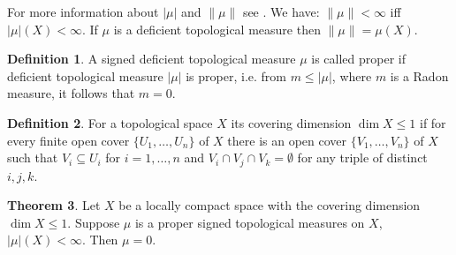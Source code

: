 \documentclass[sn-mathphys-num]{sn-jnl}%
\theoremstyle{thmstyleone}%
\theoremstyle{definition}
\newtheorem{theorem}{Theorem}%
\newtheorem{definition}[theorem]{Definition}
\begin{document}
\noindent
For more information about $ | \mu |$ and $ \| \mu \|$ see \cite[Sect. 2]{Butler:STMLC}. We have: $\| \mu \| < \infty$ iff $ | \mu| (X)  < \infty$.
If $\mu$ is a deficient topological measure then $ \| \mu \| = \mu(X)$. 
  
\begin{definition} \label{properSDTM}
A signed deficient topological measure $\mu$  is called proper if  deficient topological measure  $ | \mu |$ is proper, i.e.
from $m \le |\mu| $, where $m$ is a Radon measure, it follows that $m = 0$.
\end{definition}

\begin{definition} \label{dimX}
For a topological space $X$ its covering dimension $\dim X \le 1$ if for every finite open cover $\{ U_1, \ldots, U_n\}$ of $X$ there is an open cover
$\{ V_1, \ldots, V_n\}$ of $X$ such that $ V_i \subseteq U_i$ for $ i=1, \ldots, n$ and $V_i \cap V_j \cap V_k = \emptyset$ for any triple of distinct $i, j, k$.
\end{definition}    

\begin{theorem} \label{dimSTM}
Let $X$ be a locally compact space with the covering dimension $\dim X \le 1$. 
Suppose $ \mu$ is a proper signed topological measures on $X$, $ | \mu |(X) < \infty$. Then $ \mu = 0$. 
\end{theorem}
\end{document}
